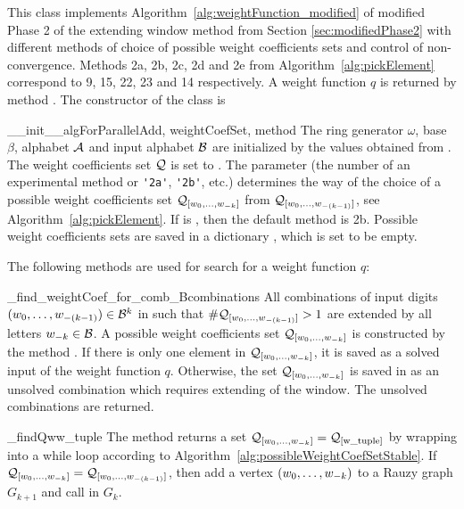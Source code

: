 
This class implements Algorithm~\ref{alg:weightFunction_modified} of modified Phase 2 of the extending window method from Section \ref{sec:modifiedPhase2} with different methods of choice of possible weight coefficients sets and control of non-convergence. Methods 2a, 2b, 2c, 2d and 2e from Algorithm~\ref{alg:pickElement} correspond to 9, 15, 22, 23 and 14 respectively. A weight function $q$ is returned by method . The constructor of the class is

\begin{method}{\_\_init\_\_}{algForParallelAdd, weightCoefSet, method}
The ring generator $\omega$, base $\beta$, alphabet $\mathcal{A}$ and input alphabet $\mathcal{B}$ are initialized by the values obtained from . The weight coefficients set $\mathcal{Q}$ is set to . The parameter  (the number of an experimental method or \verb+'2a'+, \verb+'2b'+, etc.) determines the way of the choice of a possible weight coefficients set $\mathcal{Q}_{[w_{0}, \dots, w_{-k}]}$ from $\mathcal{Q}_{[w_{0}, \dots, w_{-(k-1)}]}$, see Algorithm~\ref{alg:pickElement}. If  is , then the default method is 2b. Possible weight coefficients sets  are saved in a dictionary , which is set to be empty.
\end{method}

The following methods are used for search for a weight function $q$:

\begin{method}{\_find\_weightCoef\_for\_comb\_B}{combinations}
All combinations of input digits $(w_{0}, \dots, w_{-(k-1)}) \in \mathcal{B}^{k}$ in  such that $\#\mathcal{Q}_{[w_{0}, \dots, w_{-(k-1)}]}>1$ are extended by all letters $w_{-k}\in\mathcal{B}$. A possible weight coefficients set $\mathcal{Q}_{[w_{0}, \dots, w_{-k}]}$ is constructed by the method . If there is only one element in $\mathcal{Q}_{[w_{0}, \dots, w_{-k}]}$, it is saved as a solved input of the weight function $q$. Otherwise, the set $\mathcal{Q}_{[w_{0}, \dots, w_{-k}]}$ is saved in  as an unsolved combination which requires extending of the window. The unsolved combinations are returned.  
\end{method}

\begin{method}{\_findQw}{w\_tuple}
The method returns a set $\mathcal{Q}_{[w_{0}, \dots, w_{-k}]}=\mathcal{Q}_{[\text{w\_tuple}]}$ by wrapping  into a while loop according to Algorithm~\ref{alg:possibleWeightCoefSetStable}. If $\mathcal{Q}_{[w_{0}, \dots, w_{-k}]}=\mathcal{Q}_{[w_{0}, \dots, w_{-(k-1)}]}$, then add a vertex $(w_{0}, \dots, w_{-k})$ to a Rauzy graph $G_{k+1}$ and call  in $G_{k}$.
\end{method}

